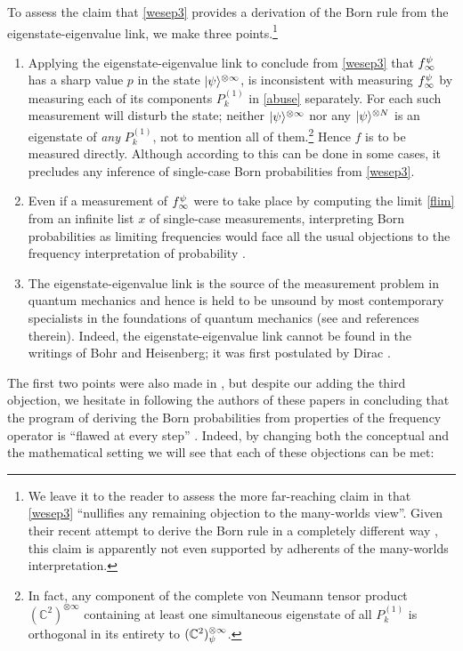 \documentclass[12pt]{article}
\newcommand{\ot}{\otimes}
\newcommand{\er}{\eqref}
\newcommand{\C}{{\mathbb C}} \newcommand{\D}{{\mathbb D}}
\begin{document}
To assess the claim that  \er{wesep3} provides a derivation of  the Born rule from the eigenstate-eigenvalue link, we make three points.\footnote{We leave it to the reader to assess
the more far-reaching claim in  \cite{vW} that \er{wesep3} ``nullifies any remaining objection to the many-worlds view''. Given their recent attempt to derive the Born rule in a completely different way  \cite{23,26}, this claim is apparently not even supported by adherents of the many-worlds interpretation.}
\begin{enumerate}
\item Applying  the  eigenstate-eigenvalue link to conclude from \er{wesep3} that
$f_{\infty}^{\psi}$ has a sharp value $p$ in the state $|\ps\ra^{\ot\infty}$, is inconsistent with measuring
$f_{\infty}^{\psi}$ by measuring each of its components $P^{(1)}_k$ in \er{abuse} separately. For each such measurement will disturb the state; neither $|\ps\ra^{\ot\infty}$ nor any $|\ps\ra^{\ot N}$ is an eigenstate
of \emph{any} $P^{(1)}_k$, not to mention all of them.\footnote{In fact, any component of the complete von Neumann tensor product
$(\C^2)^{\ot\infty}$ containing at least one simultaneous eigenstate of all $P^{(1)}_k$ is orthogonal in its entirety to $(\C^2)_{\ps}^{\ot\infty}$.}
Hence $f$ is to be measured directly. Although according to \cite{14} this can be done in some cases, it precludes any inference of single-case Born probabilities from
 \er{wesep3}.
\item Even if a measurement of $f_{\infty}^{\psi}$ were to take place by computing the limit \er{flim}
from an infinite list $x$ of single-case measurements, interpreting Born probabilities as
limiting frequencies would face all the usual objections to the frequency interpretation of probability \cite{15,17,18,mellor}.
\item The eigenstate-eigenvalue link is the source of the measurement problem in quantum mechanics and hence is held to be unsound by most contemporary specialists in the foundations of quantum mechanics (see \cite{Bub,Dickson} and references therein). 
Indeed, the eigenstate-eigenvalue link  cannot be found in the writings of Bohr and Heisenberg; 
it was first postulated by Dirac \cite{Dir}.
\end{enumerate}
 The first two points were also made in \cite{11,12}, but despite our adding the third objection, we hesitate in following the authors of these papers in concluding that the program of deriving the Born probabilities from properties of the frequency operator is ``flawed at every step'' \cite{12}. Indeed, by changing both the conceptual and the mathematical setting we will see that each of these objections can be met:
\end{document}
